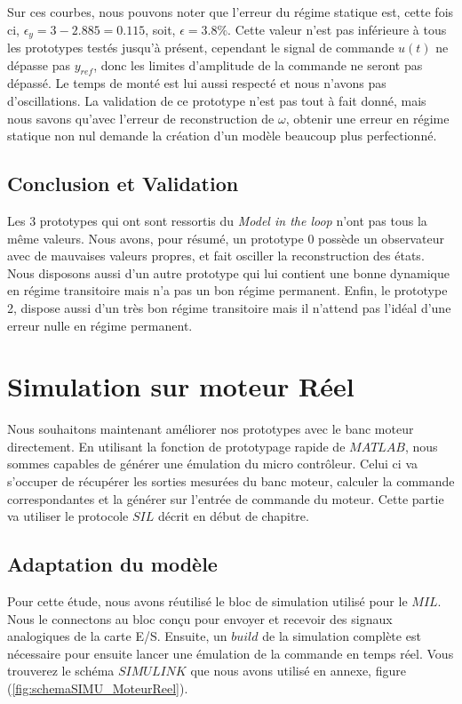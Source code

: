 		Sur ces courbes, nous pouvons noter que l'erreur du régime statique est, cette fois ci, $\epsilon_y = 3 - 2.885 = 0.115$, soit, $\epsilon = 3.8\%$. Cette valeur n'est pas inférieure à tous les prototypes testés jusqu'à présent, cependant le signal de commande $u(t)$ ne dépasse pas $y_{ref}$, donc les limites d'amplitude de la commande ne seront pas dépassé. Le temps de monté est lui aussi respecté et nous n'avons pas d'oscillations. La validation de ce prototype n'est pas tout à fait donné, mais nous savons qu'avec l'erreur de reconstruction de $\omega$, obtenir une erreur en régime statique non nul demande la création d'un modèle beaucoup plus perfectionné.
		\subsection{Conclusion et Validation}
	Les 3 prototypes qui ont sont ressortis du \emph{Model in the loop} n'ont pas tous la même valeurs. Nous avons, pour résumé, un prototype 0 possède un observateur avec de mauvaises valeurs propres, et fait osciller la reconstruction des états. Nous disposons aussi d'un autre prototype qui lui contient une bonne dynamique en régime transitoire mais n'a pas un bon régime permanent. Enfin, le prototype 2, dispose aussi d'un très bon régime transitoire mais il n'attend pas l'idéal d'une erreur nulle en régime permanent. 
	
	
	
\section{Simulation sur moteur Réel}
		Nous souhaitons maintenant améliorer nos prototypes avec le banc moteur directement. En utilisant la fonction de prototypage rapide de $MATLAB$, nous sommes capables de générer une émulation du micro contrôleur. Celui ci va s'occuper de récupérer les sorties mesurées du banc moteur, calculer la commande correspondantes et la générer sur l'entrée de commande du moteur. Cette partie va utiliser le protocole $SIL$ décrit en début de chapitre.
		\subsection{Adaptation du modèle}
Pour cette étude, nous avons réutilisé le bloc de simulation utilisé pour le $MIL$. Nous le connectons au bloc conçu pour envoyer et recevoir des signaux analogiques de la carte E/S. Ensuite, un $build$ de la simulation complète est nécessaire pour ensuite lancer une émulation de la commande en temps réel. Vous trouverez le schéma $SIMULINK$ que nous avons utilisé en annexe, figure (\ref{fig:schemaSIMU_MoteurReel}).
